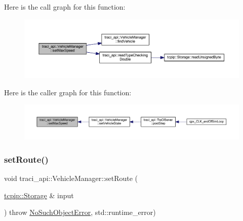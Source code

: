 Here is the call graph for this function\+:\nopagebreak
\begin{figure}[H]
\begin{center}
\leavevmode
\includegraphics[width=350pt]{classtraci__api_1_1_vehicle_manager_a5bd46032db2b057eb7e5a5c61d043827_cgraph}
\end{center}
\end{figure}
Here is the caller graph for this function\+:\nopagebreak
\begin{figure}[H]
\begin{center}
\leavevmode
\includegraphics[width=350pt]{classtraci__api_1_1_vehicle_manager_a5bd46032db2b057eb7e5a5c61d043827_icgraph}
\end{center}
\end{figure}
\mbox{\label{classtraci__api_1_1_vehicle_manager_a30063f71f02a6272244d7d1e1e9ec99d}} 
\subsubsection{\texorpdfstring{set\+Route()}{setRoute()}}
{\footnotesize\ttfamily void traci\+\_\+api\+::\+Vehicle\+Manager\+::set\+Route (\begin{DoxyParamCaption}\item[{\hyperlink{classtcpip_1_1_storage}{tcpip\+::\+Storage} \&}]{input }\end{DoxyParamCaption}) throw  \hyperlink{classtraci__api_1_1_no_such_object_error}{No\+Such\+Object\+Error}, std\+::runtime\+\_\+error) }

